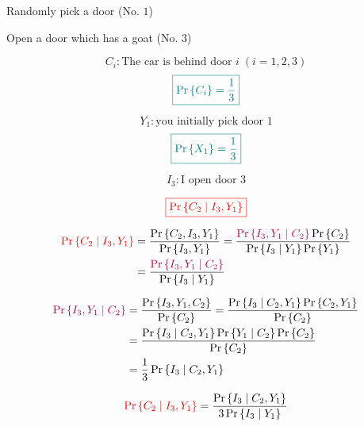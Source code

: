 
\begin{frame}{}
  \centerline{}
\end{frame}

\begin{frame}{}

  \begin{description}[(S)he]
    \centering
    \item[You:] Randomly pick a door (No. $1$)
    \item[I:] Open a door which has a goat (No. $3$) \\
  \end{description}

  \vspace{0.30cm}
  \centerline{}
\end{frame}

\begin{frame}{}
  \[
    C_i: \text{The car is behind door } i\; (i = 1, 2, 3)
  \]
  \[
    \textcolor{teal}{\boxed{\Pr\left\{C_i\right\} = \frac{1}{3}}}
  \]

  \pause
  \[
    Y_1: \text{you initially pick door } 1
  \]
  \[
    \textcolor{teal}{\boxed{\Pr\left\{X_1\right\} = \frac{1}{3}}}
  \]

  \pause
  \[
    I_3: \text{I open door } 3
  \]

  \pause
  \[
    \textcolor{red}{\boxed{\Pr\left\{C_2 \mid I_3, Y_1\right\}}}
  \]
\end{frame}

\begin{frame}{}
  \begin{align*}
    \textcolor{red}{\Pr\left\{C_2 \mid I_3, Y_1\right\}} &= \frac{\Pr\left\{C_2, I_3, Y_1\right\}}{\Pr\left\{I_3, Y_1\right\}} 
    = \frac{\textcolor{purple}{\Pr{\left\{I_3, Y_1 \mid C_2\right\}}} \Pr\left\{C_2\right\}}{\Pr\left\{I_3 \mid Y_1\right\} \Pr\left\{Y_1\right\}} \\
    &= \frac{\textcolor{purple}{\Pr{\left\{I_3, Y_1 \mid C_2\right\}}}}{\Pr\left\{I_3 \mid Y_1\right\}}
  \end{align*}

  \pause
  \begin{align*}
    \textcolor{purple}{\Pr{\left\{I_3, Y_1 \mid C_2\right\}}} &= \frac{\Pr{\left\{I_3, Y_1, C_2\right\}}}{\Pr\left\{C_2\right\}} 
    	= \frac{\Pr{\left\{I_3 \mid C_2, Y_1\right\} \Pr\left\{C_2, Y_1\right\}}}{\Pr{\left\{C_2\right\}}} \\
	&= \frac{\Pr{\left\{I_3 \mid C_2, Y_1\right\} \Pr{\left\{Y_1 \mid C_2\right\}} \Pr\left\{C_2\right\}}}{\Pr{\left\{C_2\right\}}} \\
	&= \frac{1}{3} \Pr{\left\{I_3 \mid C_2, Y_1\right\}}
  \end{align*}

  \begin{align*}
    \textcolor{red}{\Pr\left\{C_2 \mid I_3, Y_1\right\}} = \frac{\Pr{\left\{I_3 \mid C_2, Y_1\right\}}}{3 \Pr\left\{I_3 \mid Y_1\right\}}
  \end{align*}
\end{frame}

